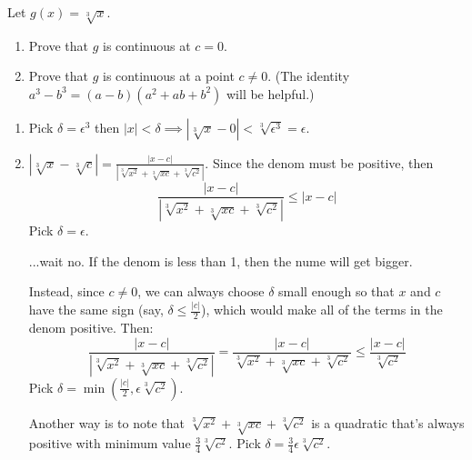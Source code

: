 \documentclass{oxmathproblems}
\begin{document}
\begin{questions}

\miquestion Let $g(x) = \sqrt[3]{x}$.
\begin{enumerate}[label=(\alph*)]
  \item Prove that $g$ is continuous at $c = 0$.
  \item Prove that $g$ is continuous at a point $c \neq 0$. (The identity $a^3-b^3=(a-b)(a^2+ab+b^2)$ will be helpful.)
\end{enumerate}

\begin{solution} 
  \begin{enumerate}[label=(\alph*)]
    \item Pick $\delta = \epsilon^3$ then $|x| < \delta \implies |\sqrt[3]{x} - 0| < \sqrt[3]{\epsilon^3} = \epsilon$.
    \item $|\sqrt[3]{x} - \sqrt[3]{c}| = \frac{|x-c|}{|\sqrt[3]{x^2} + \sqrt[3]{xc} + \sqrt[3]{c^2}|}$. Since the denom must be positive, then
    \[\frac{|x-c|}{|\sqrt[3]{x^2} + \sqrt[3]{xc} + \sqrt[3]{c^2}|} \leq |x-c|\] Pick $\delta = \epsilon$.

    ...wait no. If the denom is less than 1, then the nume will get bigger. 
    
    Instead, since $c \neq 0$, we can always choose $\delta$ small enough so that $x$ and $c$ have the same sign (say, $\delta \leq \frac{|c|}{2}$), which would make all of the terms in the denom positive. Then:
    \[\frac{|x-c|}{|\sqrt[3]{x^2} + \sqrt[3]{xc} + \sqrt[3]{c^2}|} = \frac{|x-c|}{\sqrt[3]{x^2} + \sqrt[3]{xc} + \sqrt[3]{c^2}} \leq \frac{|x-c|}{\sqrt[3]{c^2}}\]
    Pick $\delta = \min(\frac{|c|}{2}, \epsilon\sqrt[3]{c^2})$.

    Another way is to note that $\sqrt[3]{x^2} + \sqrt[3]{xc} + \sqrt[3]{c^2}$ is a quadratic that's always positive with minimum value $\frac{3}{4}\sqrt[3]{c^2}$.
    Pick $\delta=\frac{3}{4}\epsilon\sqrt[3]{c^2}$.
  \end{enumerate}
\end{solution}


\end{questions}
\end{document}
